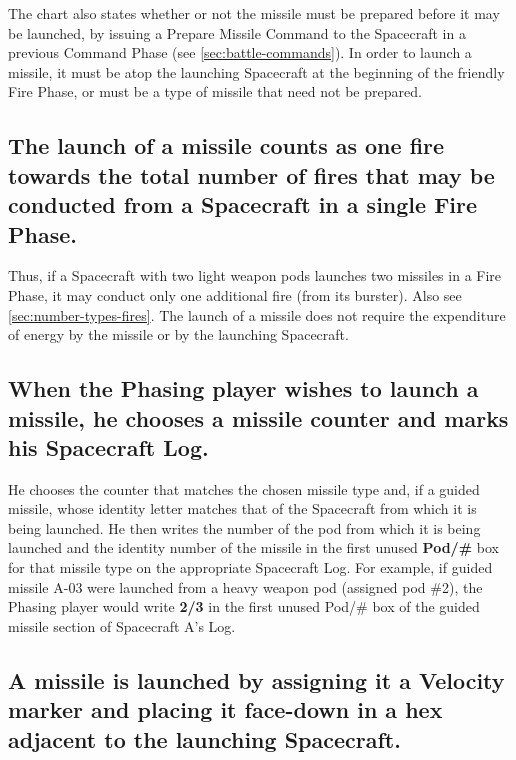 The chart also states whether or not the missile must be prepared
before it may be launched, by issuing a Prepare Missile Command to the
Spacecraft in a previous Command Phase (see
\ref{sec:battle-commands}). In order to launch 
a missile, it must be atop the launching Spacecraft at the beginning
of the friendly Fire Phase, or must be a type of missile that need not
be prepared.

\subsection[Number Of Fires]{The launch of a missile counts as one
  fire towards the total number of fires that may be conducted from a  
  Spacecraft in a single Fire Phase.}
\label{sec:number-of-fires}



Thus, if a Spacecraft with two light weapon pods launches two missiles
in a Fire Phase, it may conduct only one additional fire (from its
burster). Also see \ref{sec:number-types-fires}. The launch of a
missile does not require the 
expenditure of energy by the missile or by the launching Spacecraft.

\subsection[Launch Procedure]{When the Phasing player wishes to launch
  a missile, he chooses a missile counter and marks his  
  Spacecraft Log.}
\label{sec:launch-procedure}



He chooses the counter that matches the chosen missile type and, if a
guided missile, whose identity letter matches that of the Spacecraft
from which it is being launched. He then writes the number of the pod
from which it is being launched and the identity number of the missile
in the first unused \textbf{Pod/\#} box for that missile type on the
appropriate Spacecraft Log. For example, if guided missile A-03 were
launched from a heavy weapon pod (assigned pod \#2), the Phasing player
would write \textbf{2/3} in the first unused Pod/\# box of the guided
missile section of Spacecraft A's Log.

\subsection[Missile Launch]{A missile is launched by assigning it a
  Velocity marker and placing it face-down in a hex adjacent to the  
  launching Spacecraft.}
\label{sec:missile-launch}



